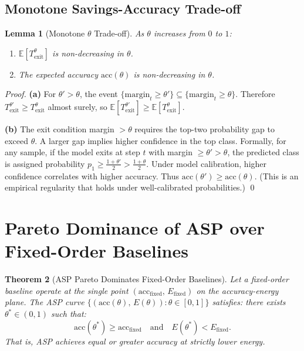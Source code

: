\documentclass[11pt,a4paper]{article}
\newtheorem{theorem}{Theorem}[section]
\newtheorem{lemma}[theorem]{Lemma}
\newcommand{\EE}{\mathbb{E}}
\begin{document}
\subsection{Monotone Savings-Accuracy Trade-off}

\begin{lemma}[Monotone $\theta$ Trade-off]
\label{lem:monotone_theta}
As $\theta$ increases from $0$ to $1$:
\begin{enumerate}[label=(\alph*)]
  \item $\EE[T^\theta_\mathrm{exit}]$ is non-decreasing in $\theta$.
  \item The expected accuracy $\mathrm{acc}(\theta)$ is non-decreasing in $\theta$.
\end{enumerate}
\end{lemma}

\begin{proof}
\textbf{(a)} For $\theta' > \theta$, the event $\{\mathrm{margin}_t \geq \theta'\}
\subseteq \{\mathrm{margin}_t \geq \theta\}$.  Therefore
$T^{\theta'}_\mathrm{exit} \geq T^\theta_\mathrm{exit}$ almost surely, so
$\EE[T^{\theta'}_\mathrm{exit}] \geq \EE[T^\theta_\mathrm{exit}]$.

\textbf{(b)} The exit condition margin $> \theta$ requires the top-two probability
gap to exceed $\theta$.  A larger gap implies higher confidence in the top class.
Formally, for any sample, if the model exits at step $t$ with margin $\geq \theta' >
\theta$, the predicted class is assigned probability $p_1 \geq \frac{1 + \theta'}{2}
> \frac{1+\theta}{2}$.  Under model calibration, higher confidence correlates
with higher accuracy.  Thus $\mathrm{acc}(\theta') \geq \mathrm{acc}(\theta)$.
(This is an empirical regularity that holds under well-calibrated probabilities.)
\qed
\end{proof}

\section{Pareto Dominance of ASP over Fixed-Order Baselines}

\begin{theorem}[ASP Pareto Dominates Fixed-Order Baselines]
\label{thm:pareto}
Let a fixed-order baseline operate at the single point
$(\mathrm{acc}_\mathrm{fixed},\, E_\mathrm{fixed})$ on the accuracy-energy plane.
The ASP curve $\{(\mathrm{acc}(\theta),\, E(\theta)) : \theta \in [0,1]\}$ satisfies:
there exists $\theta^* \in (0,1)$ such that:
\begin{equation}
  \mathrm{acc}(\theta^*) \geq \mathrm{acc}_\mathrm{fixed}
  \quad \text{and} \quad
  E(\theta^*) < E_\mathrm{fixed}.
  \label{eq:pareto}
\end{equation}
That is, ASP achieves equal or greater accuracy at strictly lower energy.
\end{theorem}
\end{document}
